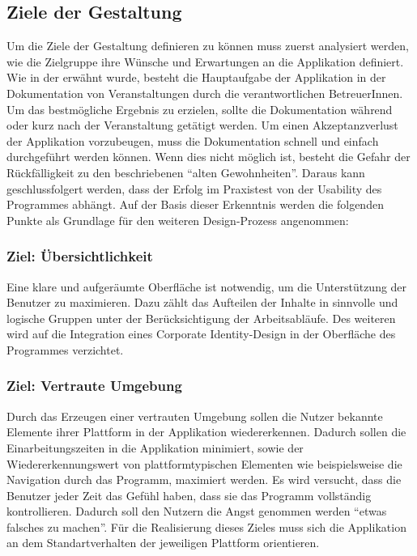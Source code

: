 \documentclass[Bachelorarbeit.tex]{subfiles}
\begin{document}
\subsection*{Ziele der Gestaltung}
\label{sub:ziele_der_gestaltung}
Um die Ziele der Gestaltung definieren zu können muss zuerst analysiert werden, wie die Zielgruppe ihre Wünsche und Erwartungen an die Applikation definiert.\\
Wie in der  erwähnt wurde, besteht die Hauptaufgabe der Applikation in der Dokumentation von Veranstaltungen durch die verantwortlichen BetreuerInnen.
Um das bestmögliche Ergebnis zu erzielen, sollte die Dokumentation während oder kurz nach der Veranstaltung getätigt werden. 
Um einen Akzeptanzverlust der Applikation vorzubeugen, muss die Dokumentation schnell und einfach durchgeführt werden können.
Wenn dies nicht möglich ist, besteht die Gefahr der Rückfälligkeit zu den beschriebenen "`alten Gewohnheiten"'. 
Daraus kann geschlussfolgert werden, dass der Erfolg im Praxistest von der Usability des Programmes abhängt. 
Auf der Basis dieser Erkenntnis werden die folgenden Punkte als Grundlage für den weiteren Design-Prozess angenommen: 

\subsubsection*{Ziel: Übersichtlichkeit}
\label{subsub:ziel_uebersichtlichkeit}
Eine klare und aufgeräumte Oberfläche ist notwendig, um die Unterstützung der Benutzer zu maximieren. 
Dazu zählt das Aufteilen der Inhalte in sinnvolle und logische Gruppen unter der Berücksichtigung der Arbeitsabläufe.
Des weiteren wird auf die Integration eines Corporate Identity-Design in der Oberfläche des Programmes verzichtet.

\subsubsection*{Ziel: Vertraute Umgebung}
\label{subsub:ziel_vertraute_umgebung}
Durch das Erzeugen einer vertrauten Umgebung sollen die Nutzer bekannte Elemente ihrer Plattform in der Applikation wiedererkennen.
Dadurch sollen die Einarbeitungszeiten in die Applikation minimiert, sowie der Wiedererkennungswert von plattformtypischen Elementen wie beispielsweise die Navigation durch das Programm, maximiert werden.
Es wird versucht, dass die Benutzer jeder Zeit das Gefühl haben, dass sie das Programm vollständig kontrollieren.
Dadurch soll den Nutzern die Angst genommen werden "`etwas falsches zu machen"'.
Für die Realisierung dieses Zieles muss sich die Applikation an dem Standartverhalten der jeweiligen Plattform orientieren.
\newpage
\end{document}
